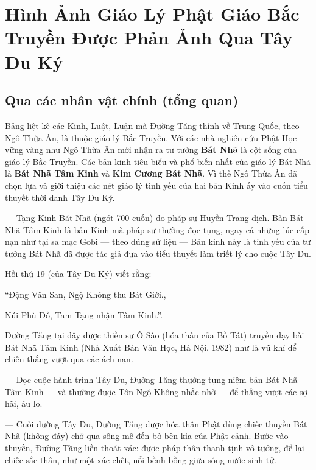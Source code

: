\chapter{Hình Ảnh Giáo Lý Phật Giáo Bắc Truyền Được Phản Ảnh Qua Tây Du Ký} %
\label{cha:hinh_anh_giao_ly_phat_giao_bac_truyen}

\section{Qua các nhân vật chính (tổng quan)} %
\label{sec:qua_cac_nhan_vat_chinh}

Bảng liệt kê các Kinh, Luật, Luận mà Đường Tăng thỉnh về Trung Quốc, theo Ngô Thừa Ân, là thuộc giáo lý Bắc Truyền. Với các nhà nghiên cứu Phật Học vững vàng như Ngô Thừa Ân mới nhận ra tư tưởng {\bf Bát Nhã} là cột sống của giáo lý Bắc Truyền. Các bản kinh tiêu biểu và phổ biến nhất của giáo lý Bát Nhã là {\bf Bát Nhã Tâm Kinh} và {\bf Kim Cương Bát Nhã}. Vì thế Ngô Thừa Ân đã chọn lựa và giới thiệu các nét giáo lý tinh yếu của hai bản Kinh ấy vào cuốn tiểu thuyết thời danh Tây Du Ký.

— Tạng Kinh Bát Nhã (ngót 700 cuốn) do pháp sư Huyền Trang dịch. Bản Bát Nhã Tâm Kinh là bản Kinh mà pháp sư thường đọc tụng, ngay cả những lúc cấp nạn như tại sa mạc Gobi — theo đúng sử liệu — Bản kinh này là tinh yếu của tư tưởng Bát Nhã đã được tác giả đưa vào tiểu thuyết làm triết lý cho cuộc Tây Du.

Hồi thứ 19 (của Tây Du Ký) viết rằng:

\begin{itshape}
``Động Vân San, Ngộ Không thu Bát Giới.,

Núi Phù Đồ, Tam Tạng nhận Tâm Kinh.''.
\end{itshape}

Đường Tăng tại đây được thiền sư Ô Sào (hóa thân của Bồ Tát) truyền dạy bài Bát Nhã Tâm Kinh (Nhà Xuất Bản Văn Học, Hà Nội. 1982) như là vũ khí để chiến thắng vượt qua các ách nạn.

— Dọc cuộc hành trình Tây Du, Đường Tăng thường tụng niệm bản Bát Nhã Tâm Kinh — và thường được Tôn Ngộ Không nhắc nhở — để thắng vượt các sợ hãi, âu lo.

— Cuối đường Tây Du, Đường Tăng được hóa thân Phật dùng chiếc thuyền Bát Nhã (không đáy) chở qua sông mê đến bờ bên kia của Phật cảnh. Bước vào thuyền, Đường Tăng liền thoát xác: được pháp thân thanh tịnh vô tướng, để lại chiếc sắc thân, như một xác chết, nổi bềnh bồng giữa sóng nước sinh tử.

